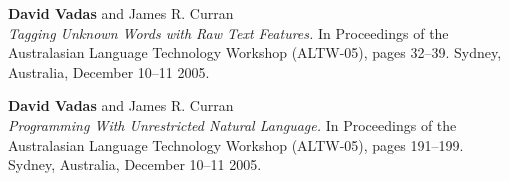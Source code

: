 \documentclass[]{article}
\begin{document}
\vbox{}

\textbf{David Vadas} and James R. Curran\\
\textit{Tagging Unknown Words with Raw Text Features.} In Proceedings of the
Australasian Language Technology Workshop (ALTW-05), pages 32--39.
Sydney, Australia, December 10--11 2005. \\  

\vbox{}

\textbf{David Vadas} and James R. Curran\\
\textit{Programming With Unrestricted Natural Language.} In Proceedings of the
Australasian Language Technology Workshop (ALTW-05), pages 191--199. 
Sydney, Australia, December 10--11 2005. \\  
 
\begin{comment}

\section*{Research Experience}
\setlength{\tabcolsep}{0.1cm}
\begin{table*}[h!]
\begin{tabular}[h!]{p{13.5cm}l}

\textbf{The University of Sydney} & \\
Research Assistant, School of I.T. & Nov 2004 -- Jan 2005 \\
\hspace{0.5cm}Developed Intelligent Tutoring Systems (ITS) & \\

Vacation Scholar, School of I.T. (Information Visualisation Group) & Nov 2003 -- Mar 2004 \\
\hspace{0.5cm}Implemented process tree visualisation software & \\
& \\

\end{tabular}
\end{table*}



\section*{Awards \& Achievements}
\begin{table*}[h!]
\begin{tabular}[h]{p{13.5cm}ll}


\end{comment}
\end{document}
